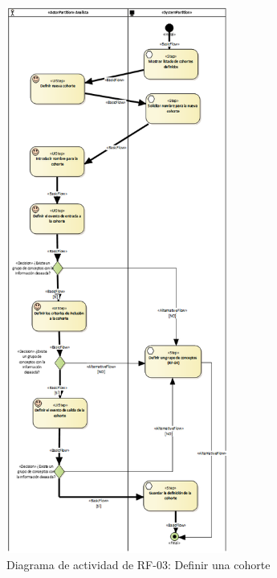 \begin{figure}[H]
    \centering
    \includegraphics[width=0.65\textwidth]{figures/FR03.png}
    \caption{Diagrama de actividad de RF-03: Definir una cohorte}
    \label{fig:FR03}
\end{figure}


